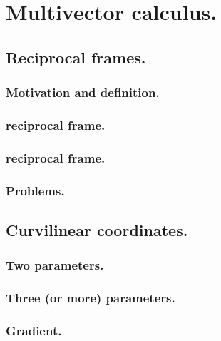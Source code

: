 %
%
\chapter{Multivector calculus.}
   \section{Reciprocal frames.}
      \subsection{Motivation and definition.}
         
         
      \subsection{ reciprocal frame.}
         
      \subsection{ reciprocal frame.}
         
      \subsection{Problems.}
         
         
   \section{Curvilinear coordinates.}
      \subsection{Two parameters.}
         
      \subsection{Three (or more) parameters.}
         
      \subsection{Gradient.}
         

